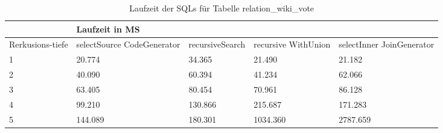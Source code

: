 \begin{table}[H]
	\begin{tabular}{l|l|l|l|l|l|}
		\cline{2-6}
		& \multicolumn{5}{|l|}{Laufzeit in MS}                                                                                                                                                  \\ \hline
		\multicolumn{1}{|l|}{\multirow{2}{2cm}{Rerkusions-tiefe}} & \multicolumn{2}{|l|}{\multirow{2}{3cm}{selectSource CodeGenerator}} & \multirow{2}{2.8cm}{recursiveSearch} & \multirow{2}{2.5cm}{recursive WithUnion} & \multirow{2}{2.5cm}{selectInner JoinGenerator} \\
		\multicolumn{1}{|l|}{}
		& \multicolumn{2}{|l|}{}                                           &                                  &                                     &                                           \\ \hline
		
		\multicolumn{1}{|l|}{1}                                 & \multicolumn{2}{l|}{20.774}                                      & 34.365                                                & 21.490                                                    & 21.182                                                          \\ \hline
		\multicolumn{1}{|l|}{2}                                 & \multicolumn{2}{l|}{40.090}                                      & 60.394                                                & 41.234                                                    & 62.066                                                          \\ \hline
		\multicolumn{1}{|l|}{3}                                 & \multicolumn{2}{l|}{63.405}                                      & 80.454                                                & 70.961                                                    & 86.128                                                          \\ \hline
		\multicolumn{1}{|l|}{4}                                 & \multicolumn{2}{l|}{99.210}                                      & 130.866                                               & 215.687                                                   & 171.283                                                         \\ \hline
		\multicolumn{1}{|l|}{5}                                 & \multicolumn{2}{l|}{144.089}                                     & 180.301                                               & 1034.360                                                  & 2787.659                                                        \\ \hline
		
		
		
	\end{tabular}
	\caption{Laufzeit der SQLs für Tabelle relation\_wiki\_vote}
\end{table}


